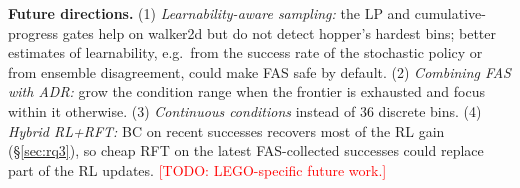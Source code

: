 \documentclass{article}
\newcommand{\todo}[1]{\textcolor{red}{[TODO: #1]}}
\newcommand{\fas}{\textsc{FAS}}
\begin{document}
\textbf{Future directions.}
(1) \emph{Learnability-aware sampling:} the LP and cumulative-progress gates help on walker2d but do not detect hopper's hardest bins; better estimates of learnability, e.g.\ from the success rate of the stochastic policy or from ensemble disagreement, could make \fas{} safe by default.
(2) \emph{Combining \fas{} with ADR:} grow the condition range when the frontier is exhausted and focus within it otherwise.
(3) \emph{Continuous conditions} instead of 36 discrete bins.
(4) \emph{Hybrid RL+RFT:} BC on recent successes recovers most of the RL gain (\S\ref{sec:rq3}), so cheap RFT on the latest \fas{}-collected successes could replace part of the RL updates.
\todo{LEGO-specific future work.}

\acknowledgments{\todo{optional}}

{\small}
\end{document}
